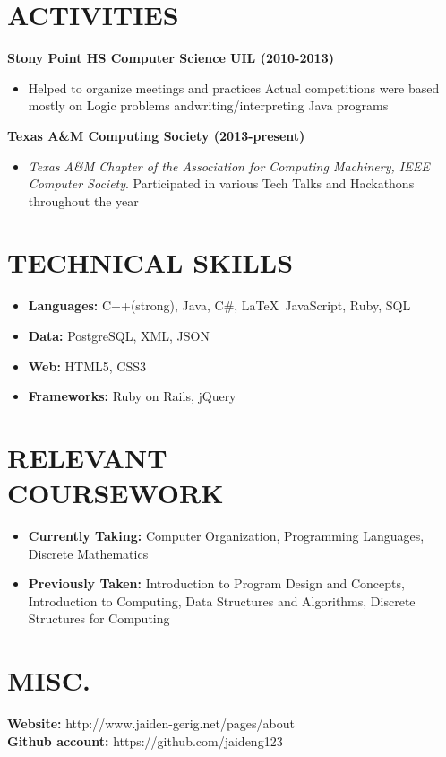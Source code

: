 \documentclass[margin,11pt]{res} %
\begin{document}
\begin{resume}
\section{ACTIVITIES}      \textbf{Stony Point HS Computer Science UIL (2010-2013)}
					\begin{itemize}%
                    \item[] Helped to organize meetings and practices
					Actual competitions were based mostly on Logic problems andwriting/interpreting Java programs
					\end{itemize}
                    \textbf{Texas A\&M Computing Society (2013-present)}
				    \begin{itemize}  %
                    \item[] \textit{Texas A\&M Chapter of the Association for Computing Machinery,
                    IEEE Computer Society}. Participated in various Tech Talks and Hackathons throughout the year
                    \end{itemize}
                    
\section{TECHNICAL SKILLS}	
							\begin{itemize}
                    		\item \textbf{Languages:} C++(strong), Java, C\#, \LaTeX\, 
                    		JavaScript, Ruby, SQL
                    		\item \textbf{Data:} PostgreSQL, XML, JSON
                    		\item \textbf{Web:} HTML5, CSS3
                    		\item \textbf{Frameworks:} Ruby on Rails, jQuery
                    		\end{itemize} 
\section{RELEVANT\\ COURSEWORK}		\begin{itemize}
							\item \textbf{Currently Taking:} Computer Organization,
							Programming Languages, Discrete Mathematics
							\item  \textbf{Previously Taken:} Introduction to Program Design and Concepts, Introduction to Computing, Data Structures and Algorithms, Discrete Structures for Computing
							\end{itemize}
\section{MISC.} 	\textbf{Website:} http://www.jaiden-gerig.net/pages/about\\
					\textbf{Github account:} https://github.com/jaideng123
\end{resume} 
\end{document}
